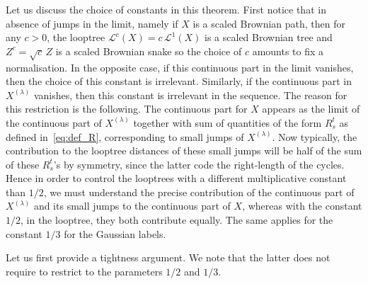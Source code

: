 \documentclass[british, a4paper,11pt]{article}
\numberwithin{equation}{section}
\theoremstyle{definition}
\newcommand{\Loop}{\mathscr{L}}
\begin{document}
Let us discuss the choice of constants in this theorem.
First notice that in absence of jumps in the limit, namely if $X$ is a scaled Brownian 
path, then for any $c > 0$, the looptree $\Loop^{c}(X) = c\, \Loop^{1}(X)$ is a scaled Brownian tree and $Z^c = \sqrt{c}\, Z$ is a scaled Brownian snake so the choice of $c$ amounts to fix a normalisation. 
In the opposite case, if this continuous part in the limit vanishes, then the choice of this constant is irrelevant. Similarly, 
if the continuous part in $X^{(\lambda)}$ vanishes, then this constant is irrelevant in the sequence.
The reason for this restriction is the following. The continuous part for $X$ appears as the limit of the continuous part of $X^{(\lambda)}$ together with sum of quantities of the form $R^t_s$ as defined in~\eqref{eq:def_R}, corresponding to small jumps of $X^{(\lambda)}$. Now typically, the contribution to the looptree distances of these small jumps will be half of the sum of these $R^t_s$'s by symmetry, since the latter code the right-length of the cycles. Hence in order to control the looptrees with a different multiplicative constant than $1/2$, we must understand the precise contribution of the continuous part of $X^{(\lambda)}$ and its small jumps to the continuous part of $X$, whereas with the constant $1/2$, in the looptree, they both contribute equally.
The same applies for the constant $1/3$ for the Gaussian labels.

Let us first provide a tightness argument. We note that the latter does not require to restrict to the parameters $1/2$ and $1/3$.
\end{document}
